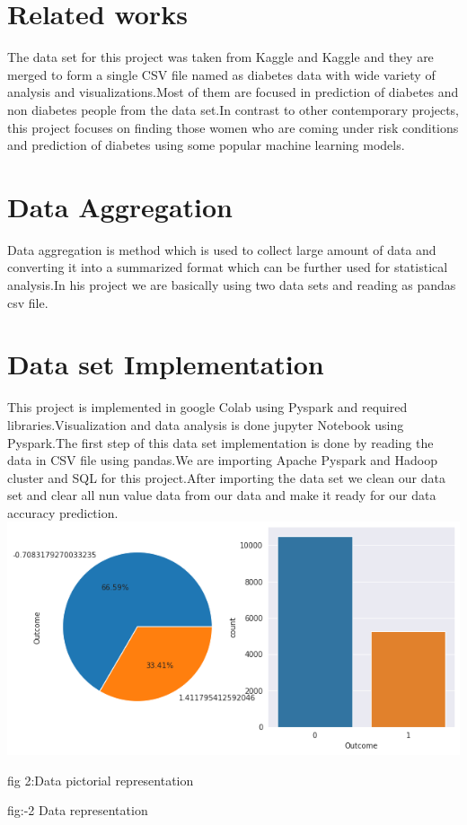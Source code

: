 \documentclass[journal,twoside,web]{ieeecolor}
\begin{document}
\section{Related works}
The data set for this project was taken from Kaggle\cite{DATA} and Kaggle\cite{data} and they are merged to form a single CSV file named as diabetes data with wide variety of analysis and visualizations.Most of them are focused in prediction of diabetes and non diabetes people from the data set.In contrast to other contemporary projects, this project  focuses on finding those women who are coming under risk conditions and prediction of diabetes using some popular machine learning models.

\section{Data Aggregation}
Data aggregation is method which is used to collect large amount of data and converting it into a summarized format which can be further used for statistical analysis.In his project we are basically using two data sets and reading as pandas csv file.

\section{Data set Implementation}
This project is implemented in google Colab using Pyspark and required libraries.Visualization and data analysis is done jupyter Notebook using Pyspark.The first step of this data set implementation is done by reading the data in CSV file using pandas.We are importing Apache Pyspark and Hadoop cluster and SQL for this project.After importing the data set we clean our data set and clear all nun value data from our data and make it ready for our data accuracy prediction.
\includegraphics[scale=0.4]{data representation.png}
\caption{fig 2:Data pictorial representation}
\label{fig 2}
fig:-2 Data representation
\end{document}

